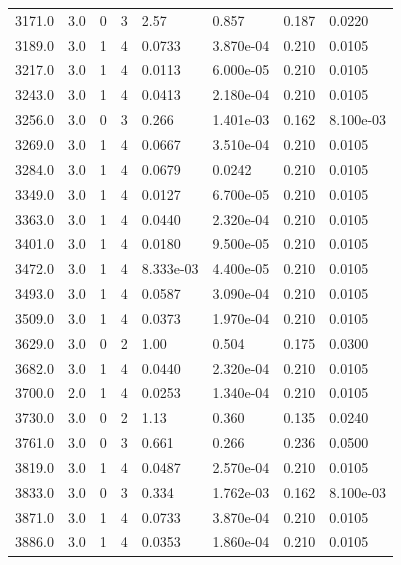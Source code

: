 \documentclass[preview]{standalone}
\begin{document}
{{{\begin{tabular}{L{1.2cm}C{1.2cm} C{0.3cm}C{0.5cm} C{1.4cm}C{1.4cm} C{1.4cm}C{1.4cm}}
  3171.0  &   3.0  & 0     &  3 &  2.57  & 0.857  & 0.187 &  0.0220   \\ 
  3189.0  &   3.0  & 1     &  4 &  0.0733  & 3.870e-04  & 0.210 &  0.0105   \\ 
  3217.0  &   3.0  & 1     &  4 &  0.0113  & 6.000e-05  & 0.210 &  0.0105   \\ 
  3243.0  &   3.0  & 1     &  4 &  0.0413  & 2.180e-04  & 0.210 &  0.0105   \\ 
  3256.0  &   3.0  & 0     &  3 &  0.266  & 1.401e-03  & 0.162 &  8.100e-03   \\ 
  3269.0  &   3.0  & 1     &  4 &  0.0667  & 3.510e-04  & 0.210 &  0.0105   \\ 
  3284.0  &   3.0  & 1     &  4 &  0.0679  & 0.0242  & 0.210 &  0.0105   \\ 
  3349.0  &   3.0  & 1     &  4 &  0.0127  & 6.700e-05  & 0.210 &  0.0105   \\ 
  3363.0  &   3.0  & 1     &  4 &  0.0440  & 2.320e-04  & 0.210 &  0.0105   \\ 
  3401.0  &   3.0  & 1     &  4 &  0.0180  & 9.500e-05  & 0.210 &  0.0105   \\ 
  3472.0  &   3.0  & 1     &  4 &  8.333e-03  & 4.400e-05  & 0.210 &  0.0105   \\ 
  3493.0  &   3.0  & 1     &  4 &  0.0587  & 3.090e-04  & 0.210 &  0.0105   \\ 
  3509.0  &   3.0  & 1     &  4 &  0.0373  & 1.970e-04  & 0.210 &  0.0105   \\ 
  3629.0  &   3.0  & 0     &  2 &  1.00  & 0.504  & 0.175 &  0.0300   \\ 
  3682.0  &   3.0  & 1     &  4 &  0.0440  & 2.320e-04  & 0.210 &  0.0105   \\ 
  3700.0  &   2.0  & 1     &  4 &  0.0253  & 1.340e-04  & 0.210 &  0.0105   \\ 
  3730.0  &   3.0  & 0     &  2 &  1.13  & 0.360  & 0.135 &  0.0240   \\ 
  3761.0  &   3.0  & 0     &  3 &  0.661  & 0.266  & 0.236 &  0.0500   \\ 
  3819.0  &   3.0  & 1     &  4 &  0.0487  & 2.570e-04  & 0.210 &  0.0105   \\ 
  3833.0  &   3.0  & 0     &  3 &  0.334  & 1.762e-03  & 0.162 &  8.100e-03   \\ 
  3871.0  &   3.0  & 1     &  4 &  0.0733  & 3.870e-04  & 0.210 &  0.0105   \\ 
  3886.0  &   3.0  & 1     &  4 &  0.0353  & 1.860e-04  & 0.210 &  0.0105   \\ 

\end{tabular}}}}
\end{document}
